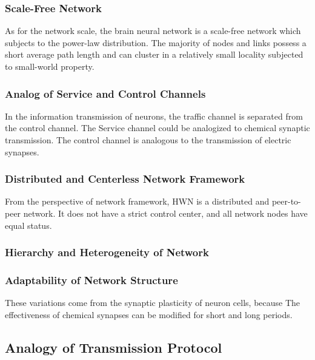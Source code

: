 \documentclass[journal,comsoc]{IEEEtran}
\begin{document}
			\subsubsection{Scale-Free Network}
				As for the network scale, the brain neural network is a scale-free network which subjects to the power-law distribution. 
				The majority of nodes and links possess a short average path length and can cluster in a relatively small locality subjected to small-world property.
				
			\subsubsection{Analog of Service and Control Channels}
				In the information transmission of neurons, the traffic channel is separated from the control channel.
				The Service channel could be analogized to chemical synaptic transmission. 			
				The control channel is analogous to the transmission of electric synapses. 
			
			\subsubsection{Distributed and Centerless Network Framework}
				From the perspective of network framework, HWN is a distributed and peer-to-peer network. 
				It does not have a strict control center, and all network nodes have equal status.
				
			
			\subsubsection{Hierarchy and Heterogeneity of Network}
			
			\subsubsection{Adaptability of Network Structure}
				These variations come from the synaptic plasticity of neuron cells, because The effectiveness of chemical synapses can be modified for short and long periods\cite{kandel2000principles}.
			
			
		\subsection{Analogy of Transmission Protocol}
		
\end{document}
